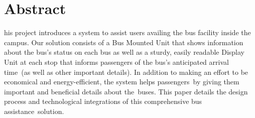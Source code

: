 \section{Abstract}

his project introduces a system to assist users availing the bus facility inside the campus. Our solution consists of a Bus Mounted Unit that shows information about the bus's status on each bus as well as a sturdy, easily readable Display Unit at each stop that informs passengers of the bus's anticipated arrival time (as well as other important details). In addition to making an effort to be economical and energy-efficient, the system helps passengers by giving them important and beneficial details about the buses. This paper details the design process and technological integrations of this comprehensive bus assistance solution.
